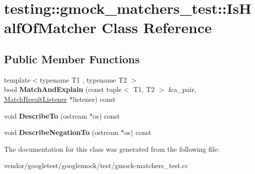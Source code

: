 \hypertarget{classtesting_1_1gmock__matchers__test_1_1_is_half_of_matcher}{}\section{testing\+:\+:gmock\+\_\+matchers\+\_\+test\+:\+:Is\+Half\+Of\+Matcher Class Reference}
\label{classtesting_1_1gmock__matchers__test_1_1_is_half_of_matcher}
\subsection*{Public Member Functions}
\begin{DoxyCompactItemize}
\item 
\mbox{\label{classtesting_1_1gmock__matchers__test_1_1_is_half_of_matcher_a8c919d71f6f7e05ac76c67f37107808c}} 
{\footnotesize template$<$typename T1 , typename T2 $>$ }\\bool {\bfseries Match\+And\+Explain} (const tuple$<$ T1, T2 $>$ \&a\+\_\+pair, \hyperlink{classtesting_1_1_match_result_listener}{Match\+Result\+Listener} $\ast$listener) const
\item 
\mbox{\label{classtesting_1_1gmock__matchers__test_1_1_is_half_of_matcher_aaf62b9984288cc339599286352d82e91}} 
void {\bfseries Describe\+To} (ostream $\ast$os) const
\item 
\mbox{\label{classtesting_1_1gmock__matchers__test_1_1_is_half_of_matcher_a759ba45c89acfa77a4e1afe95e7b768d}} 
void {\bfseries Describe\+Negation\+To} (ostream $\ast$os) const
\end{DoxyCompactItemize}


The documentation for this class was generated from the following file\+:\begin{DoxyCompactItemize}
\item 
vendor/googletest/googlemock/test/gmock-\/matchers\+\_\+test.\+cc\end{DoxyCompactItemize}
